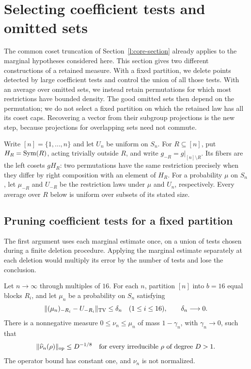 \section{Selecting coefficient tests and omitted sets}
\label{l:domains-section}

The common coset truncation of Section~\ref{l:core-section} already
applies to the marginal hypotheses considered here. This section gives
two different constructions of a retained measure. With a fixed
partition, we delete points detected by large coefficient tests and
control the union of all those tests. With an average over omitted sets,
we instead retain permutations for which most restrictions have bounded
density. The good omitted sets then depend on the permutation; we do not
select a fixed partition on which the retained law has all its coset
caps. Recovering a vector from their subgroup projections is the new
step, because projections for overlapping sets need not commute.

Write $[n]=\{1,\ldots,n\}$ and let $U_n$ be uniform on $S_n$.
For $R\subseteq[n]$, put $H_R=\operatorname{Sym}(R)$, acting trivially outside $R$,
and write $g_{-R}=g|_{[n]\setminus R}$. Its fibers are the left cosets
$gH_R$: two permutations have the same restriction precisely when
they differ by right composition with an element of $H_R$.
For a probability $\mu$ on $S_n$, let $\mu_{-R}$ and $U_{-R}$ be
the restriction laws under $\mu$ and $U_n$, respectively.
Every average over $R$ below is uniform over subsets of its stated size.

\subsection{Pruning coefficient tests for a fixed partition}

The first argument uses each marginal estimate once, on a union of
tests chosen during a finite deletion procedure. Applying the marginal
estimate separately at each deletion would multiply its error by the
number of tests and lose the conclusion.

\begin{theorem}
\label{l:spectral-pruning}
Let $n\to\infty$ through multiples of $16$. For each $n$, partition
$[n]$ into $b=16$ equal blocks $R_i$, and let $\mu_n$ be a probability
on $S_n$ satisfying
\[
 \|(\mu_n)_{-R_i}-U_{-R_i}\|_{\mathrm{TV}}\le\delta_n
 \quad(1\le i\le16),\qquad \delta_n\longrightarrow0.
\]
There is a nonnegative measure $0\le\nu_n\le\mu_n$ of mass
$1-\gamma_n$, with $\gamma_n\to0$, such that
\[
 \|\widehat\nu_n(\rho)\|_{\mathrm{op}}\le D^{-1/8}
 \quad\text{for every irreducible $\rho$ of degree $D>1$}.
\]
The operator bound has constant one, and $\nu_n$ is not normalized.
\end{theorem}

